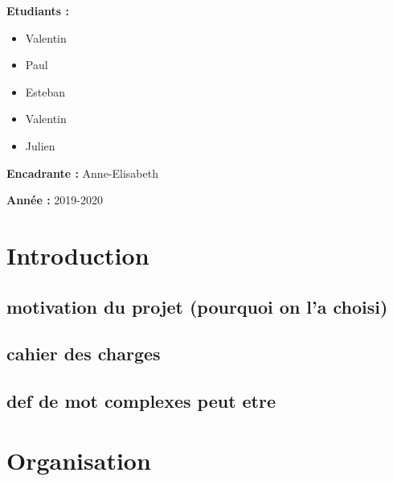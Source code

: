 \documentclass{report}
\begin{document}
\begin{titlepage}
\begin{minipage}[t]{8.5cm}
	\begin{flushleft}
	    \large{\textbf{Etudiants :}}
	    \begin{itemize}
	        \item \large{Valentin }
	        \item \large{Paul  } 
	        \item \large{Esteban }
	        \item \large{Valentin }
	        \item \large{Julien }
	    \end{itemize}
		\vspace{0.5cm}
		\large{\textbf{Encadrante :}}
		\large{Anne-Elisabeth } \\
	\end{flushleft}
\end{minipage}
\hfill
\begin{minipage}[t]{8cm}
	\begin{flushright} 
		\large{\textbf{Année :}} 
		\large{2019-2020}
	\end{flushright}
\end{minipage}
\end{titlepage}

\begin{titlepage}
\renewcommand{\contentsname}{Sommaire}
\large{\tableofcontents}
\thispagestyle{empty}
\end{titlepage}


\renewcommand{\chaptername}{Partie}

\chapter{Introduction}
    \section{motivation du projet (pourquoi on l'a choisi)}
    \section{cahier des charges}
    \section{def de mot complexes peut etre}

\chapter{Organisation}
\end{document}
